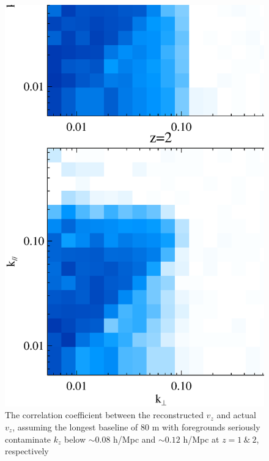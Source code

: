 \begin{figure}[btp]
\begin{minipage}[t]{0.33\linewidth}
{}
\label{fig:k3v}
\end{minipage}
\begin{minipage}[t]{0.33\linewidth}
\begin{center}
\includegraphics[width=\textwidth,height=1.7\textwidth]{figure/powv2d_z1z2_r15r10.eps}
\end{center}
\vspace{-0.7cm}
\caption{The correlation coefficient between the reconstructed $v_z$  and actual $v_z$, assuming the longest baseline of 80 m with foregrounds seriously contaminate $k_z$ below $\sim0.08$ h/Mpc and $\sim0.12$ h/Mpc at $z=1~\&~2$, respectively}

\end{minipage}
\end{figure}
